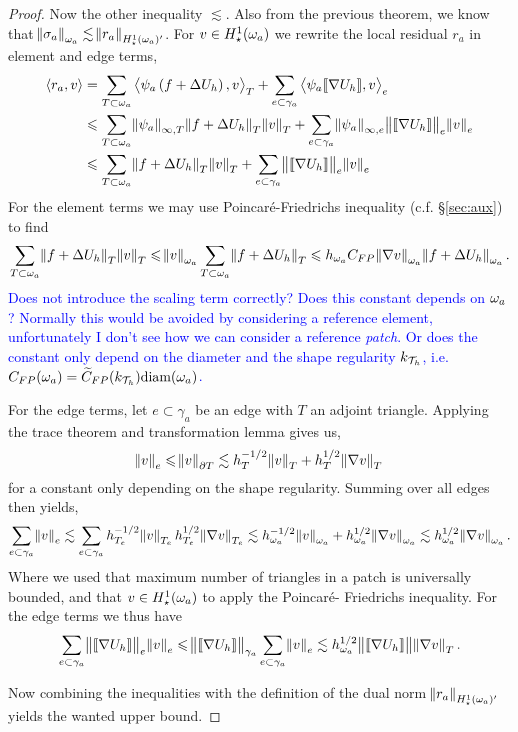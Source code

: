 \documentclass[thesis.tex]{subfiles}
\begin{document}
\begin{proof}
  Now the other inequality $\lesssim$. Also from the previous theorem, we know that $\norm{\sigma_a}_{\omega_a} \lesssim \norm{r_a}_{H_\star^1(\omega_a)'}$. For $v \in H_\star^1(\omega_a)$ we  rewrite the local residual $r_a$ in element and edge terms,
  \begin{align*}
    \left \langle r_a, v \right \rangle &= \sum_{T \subset \omega_a} \left \langle \psi_a\left(f + \Delta U_h\right), v \right \rangle_{T} + \sum_{e \subset \gamma_a} \left \langle \psi_a \llbracket \nabla U_h \rrbracket, v \right \rangle_e\\
    &\leqslant \sum_{T \subset \omega_a} \norm{\psi_a}_{\infty,T} \norm{f + \Delta U_h}_{T}\norm{v}_{T} + \sum_{e \subset \gamma_a} \norm{\psi_a}_{\infty, e} \norm{ \llbracket \nabla U_h \rrbracket}_e \norm{v}_e\\
    &\leqslant \sum_{T \subset \omega_a} \norm{f + \Delta U_h}_{T}\norm{v}_{T} + \sum_{e \subset \gamma_a} \norm{ \llbracket \nabla U_h \rrbracket}_e \norm{v}_e
  \end{align*}
  For the element terms we may use Poincar\'e-Friedrichs inequality (c.f. \S\ref{sec:aux}) to find
  \[
    \sum_{T \subset \omega_a} \norm{f + \Delta U_h}_{T} \norm{v}_T \leqslant \norm{v}_{\omega_a} \sum_{T\subset \omega_a} \norm{f + \Delta U_h}_{T} \leqslant 
    h_{\omega_a} C_{FP} \norm{\nabla v}_{\omega_a} \norm{f + \Delta U_h}_{\omega_a}.
  \]
  \textcolor{blue}{Does not introduce the scaling term correctly? Does this constant depends on $\omega_a$? Normally this would be avoided
  by considering a reference element, unfortunately I don't see how we can consider a reference \emph{patch}.
  Or does the constant only depend on the diameter and the shape regularity $k_{\mathcal{T}_h}$,
  i.e. $C_{FP}(\omega_a) = \widetilde{C}_{FP}(k_{\mathcal{T}_h})\text{diam}(\omega_a)$.}

  For the edge terms, let $e \subset \gamma_a$ be an edge with $T$ an adjoint triangle. Applying the trace theorem and transformation lemma
  gives us,
  \[ 
    \norm{v}_e \leqslant \norm{v}_{\partial T} \lesssim h_T^{-1/2} \norm{v}_T + h_T^{1/2} \norm{\nabla v}_T
  \]
  for a constant only depending on the shape regularity. 
  Summing over all edges then yields,
  \[
    \sum_{e \subset \gamma_a} \norm{v}_e \lesssim \sum_{e\subset \gamma_a}h_{T_e}^{-1/2} \norm{v}_{T_e} h_{T_e}^{1/2} \norm{\nabla v}_{T_e}
    \lesssim h_{\omega_a}^{-1/2} \norm{v}_{\omega_a} + h_{\omega_a}^{1/2} \norm{\nabla v}_{\omega_a} \lesssim h_{\omega_a}^{1/2} \norm{\nabla v}_{\omega_a}.
  \]
  Where we used that maximum number of triangles in a patch is universally bounded, and that $v \in H_\star^1(\omega_a)$ to apply the Poincar\'e-
  Friedrichs inequality. For the edge terms we thus have
  \[
    \sum_{e \subset \gamma_a} \norm{ \llbracket \nabla U_h \rrbracket}_e \norm{v}_e \leqslant \norm{\llbracket \nabla U_h \rrbracket}_{\gamma_a} \sum_{e \subset \gamma_a} \norm{v}_e \lesssim h_{\omega_a}^{1/2} \norm{\llbracket \nabla U_h \rrbracket}  \norm{\nabla v}_{T}. 
  \]

  Now combining the inequalities with the definition of the dual norm $\norm{r_a}_{H_\star^1(\omega_a)'}$ yields the wanted upper bound.
\end{proof}
\end{document}
